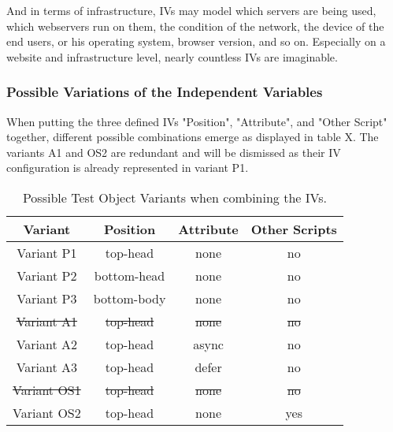 
And in terms of infrastructure, IVs may model which servers are being used, which webservers run on them, the condition of the network, the device of the end users, or his operating system, browser version, and so on.
Especially on a website and infrastructure level, nearly countless IVs are imaginable.



\subsubsection{Possible Variations of the Independent Variables}


When putting the three defined IVs "Position", "Attribute", and "Other Script" together, different possible combinations emerge as displayed in table X.
The variants A1 and OS2 are redundant and will be dismissed as their IV configuration is already represented in variant P1.

\begin{table}[h]
	\small
	\centering
	\begin{tabular}{  | c || c | c | c | } 
	\hline
	Variant & Position & Attribute & Other Scripts \\
	\hline \hline
	Variant P1 & top-head & \cellcolor{lightgrey} none & \cellcolor{lightgrey} no \\
	   Variant P2 & bottom-head & \cellcolor{lightgrey} none & \cellcolor{lightgrey} no \\
	   Variant P3 & bottom-body & \cellcolor{lightgrey} none & \cellcolor{lightgrey} no \\
	  \hline
	   \sout{Variant A1} & \cellcolor{lightgrey} \sout{top-head} & \sout{none} & \cellcolor{lightgrey} \sout{no} \\
	   Variant A2 & \cellcolor{lightgrey} top-head & async & \cellcolor{lightgrey} no \\
	   Variant A3 & \cellcolor{lightgrey} top-head & defer & \cellcolor{lightgrey} no \\
	  \hline
	  \sout{Variant OS1} & \cellcolor{lightgrey} \sout{top-head} & \cellcolor{lightgrey} \sout{none} & \sout{no} \\
	  Variant OS2 & \cellcolor{lightgrey} top-head & \cellcolor{lightgrey} none & yes \\
	  \hline
	\end{tabular}
	\medskip
	\caption{Possible Test Object Variants when combining the IVs.}
	\label{table:test_object_variants}
\end{table}


